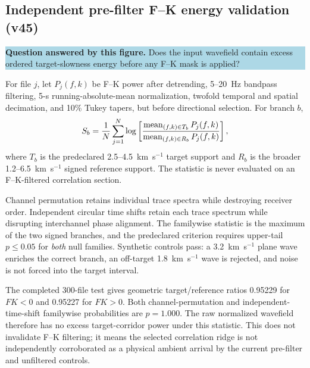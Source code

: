 \documentclass[11pt]{article}
\newcommand{\figquestion}[1]{\par\medskip\noindent\colorbox{lightblue}{\parbox{0.95\linewidth}{\textcolor{questionblue}{\textbf{Question answered by this figure.}} #1}}\par\medskip}
\begin{document}
\subsection{Independent pre-filter F--K energy validation (v45)}
\figquestion{Does the input wavefield contain excess ordered target-slowness
energy before any F--K mask is applied?}

For file $j$, let $P_j(f,k)$ be F--K power after detrending, 5--20~Hz
bandpass filtering, 5-s running-absolute-mean normalization, twofold temporal
and spatial decimation, and 10\% Tukey tapers, but before directional
selection. For branch $b$,
\[
S_b={1\over N}\sum_{j=1}^{N}\log\left[
{\operatorname{mean}_{(f,k)\in T_b}P_j(f,k)\over
 \operatorname{mean}_{(f,k)\in R_b}P_j(f,k)}\right],
\]
where $T_b$ is the predeclared 2.5--4.5~km~s$^{-1}$ target support and
$R_b$ is the broader 1.2--6.5~km~s$^{-1}$ signed reference support. The
statistic is never evaluated on an F--K-filtered correlation section.

Channel permutation retains individual trace spectra while destroying receiver
order. Independent circular time shifts retain each trace spectrum while
disrupting interchannel phase alignment. The familywise statistic is the
maximum of the two signed branches, and the predeclared criterion requires
upper-tail $p\leq0.05$ for \emph{both} null families. Synthetic controls
pass: a 3.2~km~s$^{-1}$ plane wave enriches the correct branch, an
off-target 1.8~km~s$^{-1}$ wave is rejected, and noise is not forced into
the target interval.

The completed 300-file test gives geometric target/reference ratios 0.95229
for $F K<0$ and 0.95227 for $F K>0$. Both channel-permutation and
independent-time-shift familywise probabilities are $p=1.000$. The raw
normalized wavefield therefore has no excess target-corridor power under this
statistic. This does not invalidate F--K filtering; it means the selected
correlation ridge is not independently corroborated as a physical ambient
arrival by the current pre-filter and unfiltered controls.
\end{document}
